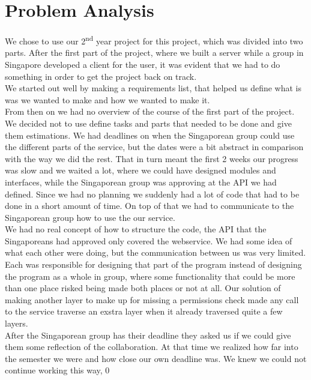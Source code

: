 \section{Problem Analysis}
We chose to use our 2\textsuperscript{nd} year project for this project, which was divided into two parts. After the first part of the project, where we built a server while a group in Singapore developed a client for the user, it was evident that we had to do something in order to get the project back on track.\\
We started out well by making a requirements list, that helped us define what is was we wanted to make and how we wanted to make it.\\
From then on we had no overview of the course of the first part of the project. We decided not to use define tasks and parts that needed to be done and give them estimations. We had deadlines on when the Singaporean group could use the different parts of the service, but the dates were a bit abstract in comparison with the way we did the rest. That in turn meant the first 2 weeks our progress was slow and we waited a lot, where we could have designed modules and interfaces, while the Singaporean group was approving at the API we had defined. Since we had no planning we suddenly had a lot of code that had to be done in a short amount of time. On top of that we had to communicate to the Singaporean group how to use the our service.\\ 
We had no real concept of how to structure the code, the API that the Singaporeans had approved only covered the webservice. We had some idea of what each other were doing, but the communication between us was very limited. Each was responsible for designing that part of the program instead of designing the program as a whole in group, where some functionality that could be more than one place risked being made both places or not at all. Our solution of making another layer to make up for missing a permissions check made any call to the service traverse an exstra layer when it already traversed quite a few layers.\\
After the Singaporean group has their deadline they asked us if we could give them some reflection of the collaboration. At that time we realized how far into the semester we were and how close our own deadline was. We knew we could not continue working this way,  
0\newpage